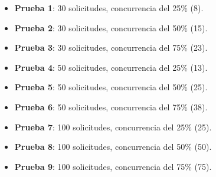 \begin{itemize}
	\item \textbf{Prueba 1}: 30 solicitudes, concurrencia del 25\% (8).
	\item \textbf{Prueba 2}: 30 solicitudes, concurrencia del 50\% (15).
	\item \textbf{Prueba 3}: 30 solicitudes, concurrencia del 75\% (23).
	\item \textbf{Prueba 4}: 50 solicitudes, concurrencia del 25\% (13).
	\item \textbf{Prueba 5}: 50 solicitudes, concurrencia del 50\% (25).
	\item \textbf{Prueba 6}: 50 solicitudes, concurrencia del 75\% (38).
	\item \textbf{Prueba 7}: 100 solicitudes, concurrencia del 25\% (25).
	\item \textbf{Prueba 8}: 100 solicitudes, concurrencia del 50\% (50).
	\item \textbf{Prueba 9}: 100 solicitudes, concurrencia del 75\% (75).
\end{itemize}

\newpage
